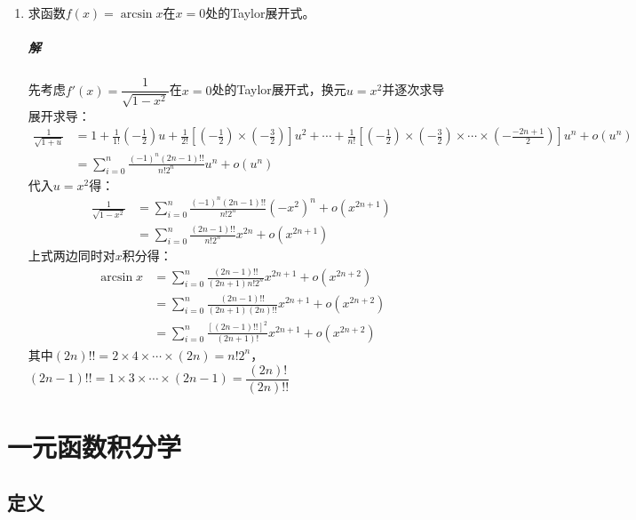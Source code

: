 \documentclass[fontset=none,openany,a4paper]{ctexbook}
\begin{document}
\begin{enumerate}
    所以$f'(a)=0$，$f''(x)$在$(-1,a)$上单调递增，在$\left(a,\dfrac{\pi}{2}\right)$上单调递减。故$f'(x)$在$\left(-1,\dfrac{\pi}{2}\right)$上存在唯一个极大值点。

    \item 求函数$f(x)=\arcsin x$在$x=0$处的Taylor展开式。

    \paragraph{解}

    先考虑$f'(x)=\dfrac{1}{\sqrt{1-x^2}}$在$x=0$处的Taylor展开式，换元$u=x^2$并逐次求导展开求导：
    \begin{align*}
    \frac{1}{\sqrt{1+u}}
    &= 1 + \frac{1}{1!}\left(-\frac{1}{2}\right)u + \frac{1}{2!}\left[\left(-\frac{1}{2}\right)\times\left(-\frac{3}{2}\right)\right]u^2 + \cdots + \frac{1}{n!}\left[\left(-\frac{1}{2}\right)\times\left(-\frac{3}{2}\right)\times\cdots\times\left(-\frac{-2n+1}{2}\right)\right]u^n + o(u^n) \\
    &= \sum_{i=0}^n \frac{(-1)^n (2n-1)!!}{n! 2^n}u^n + o(u^n)
    \end{align*}
    代入$u=x^2$得：
    \begin{align*}
        \frac{1}{\sqrt{1-x^2}}
        &= \sum_{i=0}^n \frac{(-1)^n (2n-1)!!}{n! 2^n}(-x^2)^n + o(x^{2n+1})\\
        &= \sum_{i=0}^n \frac{(2n-1)!!}{n! 2^n}x^{2n} + o(x^{2n+1})
    \end{align*}
    上式两边同时对$x$积分得：
    \begin{align*}
        \arcsin x
        &= \sum_{i=0}^n \frac{(2n-1)!!}{(2n+1)n! 2^n}x^{2n+1} + o(x^{2n+2}) \\
        &= \sum_{i=0}^n \frac{(2n-1)!!}{(2n+1)(2n)!!}x^{2n+1} + o(x^{2n+2}) \\
        &= \sum_{i=0}^n \frac{[(2n-1)!!]^2}{(2n+1)!}x^{2n+1} + o(x^{2n+2})
    \end{align*}
    其中$(2n)!!=2\times4\times\cdots\times(2n)=n!2^n$，$(2n-1)!!=1\times3\times\cdots\times(2n-1)=\dfrac{(2n)!}{(2n)!!}$

\end{enumerate}

\chapter{一元函数积分学}

\section{定义}
\end{document}
